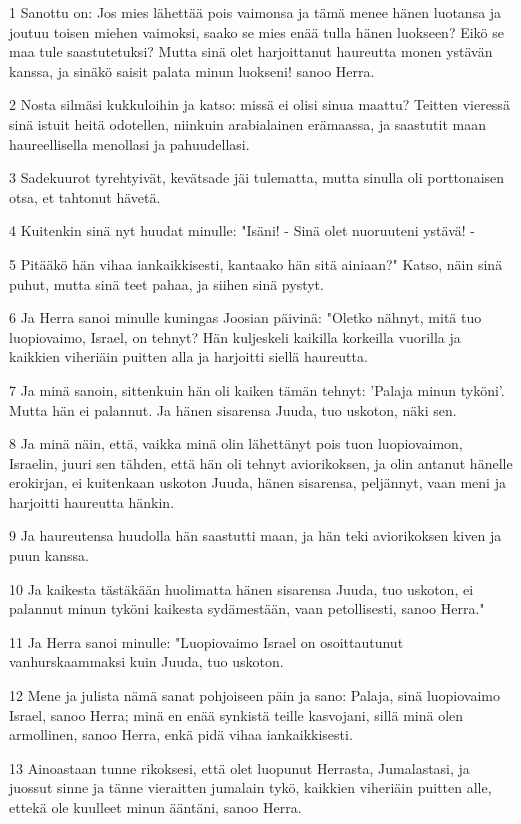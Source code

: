 \par 1 Sanottu on: Jos mies lähettää pois vaimonsa ja tämä menee hänen luotansa ja joutuu toisen miehen vaimoksi, saako se mies enää tulla hänen luokseen? Eikö se maa tule saastutetuksi? Mutta sinä olet harjoittanut haureutta monen ystävän kanssa, ja sinäkö saisit palata minun luokseni! sanoo Herra.
\par 2 Nosta silmäsi kukkuloihin ja katso: missä ei olisi sinua maattu? Teitten vieressä sinä istuit heitä odotellen, niinkuin arabialainen erämaassa, ja saastutit maan haureellisella menollasi ja pahuudellasi.
\par 3 Sadekuurot tyrehtyivät, kevätsade jäi tulematta, mutta sinulla oli porttonaisen otsa, et tahtonut hävetä.
\par 4 Kuitenkin sinä nyt huudat minulle: "Isäni! - Sinä olet nuoruuteni ystävä! -
\par 5 Pitääkö hän vihaa iankaikkisesti, kantaako hän sitä ainiaan?" Katso, näin sinä puhut, mutta sinä teet pahaa, ja siihen sinä pystyt.
\par 6 Ja Herra sanoi minulle kuningas Joosian päivinä: "Oletko nähnyt, mitä tuo luopiovaimo, Israel, on tehnyt? Hän kuljeskeli kaikilla korkeilla vuorilla ja kaikkien viheriäin puitten alla ja harjoitti siellä haureutta.
\par 7 Ja minä sanoin, sittenkuin hän oli kaiken tämän tehnyt: 'Palaja minun tyköni'. Mutta hän ei palannut. Ja hänen sisarensa Juuda, tuo uskoton, näki sen.
\par 8 Ja minä näin, että, vaikka minä olin lähettänyt pois tuon luopiovaimon, Israelin, juuri sen tähden, että hän oli tehnyt aviorikoksen, ja olin antanut hänelle erokirjan, ei kuitenkaan uskoton Juuda, hänen sisarensa, peljännyt, vaan meni ja harjoitti haureutta hänkin.
\par 9 Ja haureutensa huudolla hän saastutti maan, ja hän teki aviorikoksen kiven ja puun kanssa.
\par 10 Ja kaikesta tästäkään huolimatta hänen sisarensa Juuda, tuo uskoton, ei palannut minun tyköni kaikesta sydämestään, vaan petollisesti, sanoo Herra."
\par 11 Ja Herra sanoi minulle: "Luopiovaimo Israel on osoittautunut vanhurskaammaksi kuin Juuda, tuo uskoton.
\par 12 Mene ja julista nämä sanat pohjoiseen päin ja sano: Palaja, sinä luopiovaimo Israel, sanoo Herra; minä en enää synkistä teille kasvojani, sillä minä olen armollinen, sanoo Herra, enkä pidä vihaa iankaikkisesti.
\par 13 Ainoastaan tunne rikoksesi, että olet luopunut Herrasta, Jumalastasi, ja juossut sinne ja tänne vieraitten jumalain tykö, kaikkien viheriäin puitten alle, ettekä ole kuulleet minun ääntäni, sanoo Herra.

